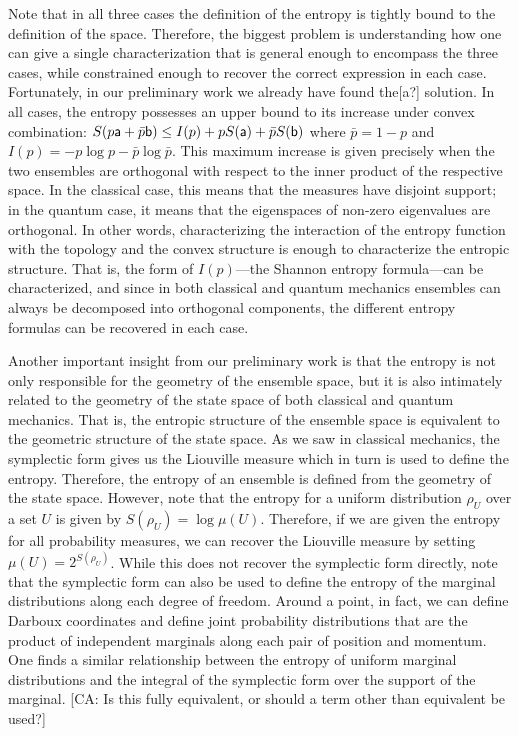 Note that in all three cases the definition of the entropy is tightly bound to the definition of the space. Therefore, the biggest problem is understanding how one can give a single characterization that is general enough to encompass the three cases, while constrained enough to recover the correct expression in each case. Fortunately, in our preliminary work we already have found the[a?] solution. In all cases, the entropy possesses an upper bound to its increase under convex combination: $S(p\ens[a] + \bar{p} \ens[b]) \leq I(p) + p S(\ens[a]) + \bar{p} S(\ens[b])$ where $\bar{p} = 1-p$ and $I(p) = -p \log p - \bar{p}\log \bar{p}$. This maximum increase is given precisely when the two ensembles are orthogonal with respect to the inner product of the respective space. In the classical case, this means that the measures have disjoint support; in the quantum case, it means that the eigenspaces of non-zero eigenvalues are orthogonal. In other words, characterizing the interaction of the entropy function with the topology and the convex structure is enough to characterize the entropic structure.  That is, the form of $I(p)$---the Shannon entropy formula---can be characterized, and since in both classical and quantum mechanics ensembles can always be decomposed into orthogonal components, the different entropy formulas can be recovered in each case.

Another important insight from our preliminary work is that the entropy is not only responsible for the geometry of the ensemble space, but it is also intimately related to the geometry of the state space of both classical and quantum mechanics. That is, the entropic structure of the ensemble space is equivalent to the geometric structure of the state space. As we saw in classical mechanics, the symplectic form gives us the Liouville measure which in turn is used to define the entropy. Therefore, the entropy of an ensemble is defined from the geometry of the state space. However, note that the entropy for a uniform distribution $\rho_U$ over a set $U$ is given by $S(\rho_U) = \log \mu(U)$. Therefore, if we are given the entropy for all probability measures, we can recover the Liouville measure by setting $\mu(U) = 2^{S(\rho_U)}$. While this does not recover the symplectic form directly, note that the symplectic form can also be used to define the entropy of the marginal distributions along each degree of freedom. Around a point, in fact, we can define Darboux coordinates and define joint probability distributions that are the product of independent marginals along each pair of position and momentum. One finds a similar relationship between the entropy of uniform marginal distributions and the integral of the symplectic form over the support of the marginal. [CA: Is this fully equivalent, or should a term other than equivalent be used?]

